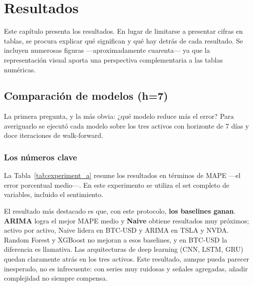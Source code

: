 \chapter{Resultados}
\label{ch:resultados}

Este capítulo presenta los resultados. En lugar de limitarse a presentar cifras en tablas, se procura explicar qué significan y qué hay detrás de cada resultado. Se incluyen numerosas figuras ---aproximadamente cuarenta--- ya que la representación visual aporta una perspectiva complementaria a las tablas numéricas.


\section{Comparación de modelos (h=7)}

La primera pregunta, y la más obvia: ¿qué modelo reduce más el error? Para averiguarlo se ejecutó cada modelo sobre los tres activos con horizonte de 7 días y doce iteraciones de walk-forward.

\subsection{Los números clave}

La Tabla~\ref{tab:experiment_a} resume los resultados en términos de MAPE ---el error porcentual medio---. En este experimento se utiliza el set completo de variables, incluido el sentimiento.

\begin{table}[H]
\centering
\caption{MAPE (\%) por modelo y activo}
\label{tab:experiment_a}

\end{table}

El resultado más destacado es que, con este protocolo, \textbf{los baselines ganan}. \textbf{ARIMA} logra el mejor MAPE medio y \textbf{Naive} obtiene resultados muy próximos; activo por activo, Naive lidera en BTC-USD y ARIMA en TSLA y NVDA. Random Forest y XGBoost no mejoran a esos baselines, y en BTC-USD la diferencia es llamativa. Las arquitecturas de deep learning (CNN, LSTM, GRU) quedan claramente atrás en los tres activos. Este resultado, aunque pueda parecer inesperado, no es infrecuente: con series muy ruidosas y señales agregadas, añadir complejidad no siempre compensa.

